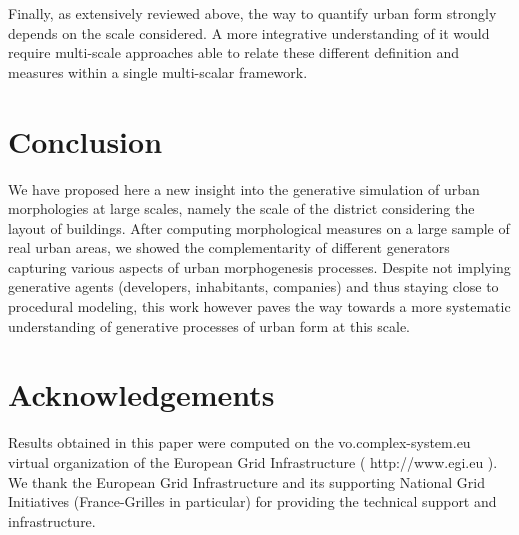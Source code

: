 \documentclass[letterpaper]{article}
\begin{document}
Finally, as extensively reviewed above, the way to quantify urban form strongly depends on the scale considered. A more integrative understanding of it would require multi-scale approaches able to relate these different definition and measures within a single multi-scalar framework.


\section{Conclusion}

We have proposed here a new insight into the generative simulation of urban morphologies at large scales, namely the scale of the district considering the layout of buildings. After computing morphological measures on a large sample of real urban areas, we showed the complementarity of different generators capturing various aspects of urban morphogenesis processes. Despite not implying generative agents (developers, inhabitants, companies) and thus staying close to procedural modeling, this work however paves the way towards a more systematic understanding of generative processes of urban form at this scale.



\section{Acknowledgements}

Results obtained in this paper were computed on the vo.complex-system.eu virtual organization of the European Grid Infrastructure ( http://www.egi.eu ). We thank the European Grid Infrastructure and its supporting National Grid Initiatives (France-Grilles in particular) for providing the technical support and infrastructure.

\footnotesize

\end{document}
